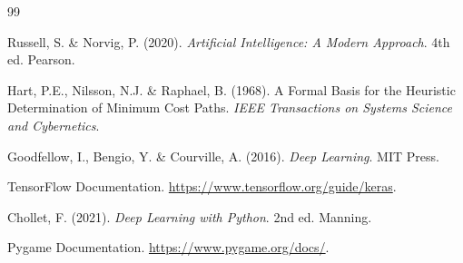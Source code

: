 \documentclass[12pt,a4paper]{article}
\begin{document}
\begin{thebibliography}{99}

Russell, S. \& Norvig, P. (2020).
\textit{Artificial Intelligence: A Modern Approach}. 4th ed. Pearson.

Hart, P.E., Nilsson, N.J. \& Raphael, B. (1968).
A Formal Basis for the Heuristic Determination of Minimum Cost Paths.
\textit{IEEE Transactions on Systems Science and Cybernetics}.

Goodfellow, I., Bengio, Y. \& Courville, A. (2016).
\textit{Deep Learning}. MIT Press.

TensorFlow Documentation. \url{https://www.tensorflow.org/guide/keras}.

Chollet, F. (2021).
\textit{Deep Learning with Python}. 2nd ed. Manning.

Pygame Documentation. \url{https://www.pygame.org/docs/}.

\end{thebibliography}
\end{document}

